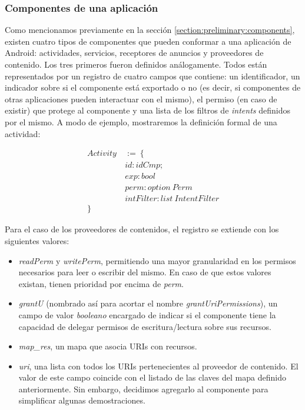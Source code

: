 \subsubsection*{Componentes de una aplicación}
Como mencionamos previamente en la sección \ref{section:preliminary:components}, existen cuatro
tipos de componentes que pueden conformar a una aplicación de Android: actividades, servicios,
receptores de anuncios y proveedores de contenido. Los tres primeros fueron definidos análogamente.
Todos están representados por un registro de cuatro campos que contiene: un identificador, un
indicador sobre si el componente está exportado o no (es decir, si componentes de otras aplicaciones
pueden interactuar con el mismo), el permiso (en caso de existir) que protege al componente y una
lista de los filtros de \textit{intents} definidos por el mismo. A modo de ejemplo, mostraremos la
definición formal de una actividad:

\begin{align*}
    Activity\  & :=\ \{                        \\
               & id: idCmp;                    \\
               & exp: bool                     \\
               & perm: option\ Perm            \\
               & intFilter: list\ IntentFilter \\
    \}
\end{align*}

Para el caso de los proveedores de contenidos, el registro se extiende con los siguientes valores:

\begin{itemize}
    \item \textit{readPerm} y \textit{writePerm}, permitiendo una mayor granularidad en los permisos
          necesarios para leer o escribir del mismo. En caso de que estos valores existan, tienen
          prioridad por encima de \textit{perm}.
    \item \textit{grantU} (nombrado así para acortar el nombre \textit{grantUriPermissions}), un
          campo de valor \textit{booleano} encargado de indicar si el componente tiene la capacidad
          de delegar permisos de escritura/lectura sobre sus recursos.
    \item \textit{map\_res}, un mapa que asocia URIs con recursos.
    \item \textit{uri}, una lista con todos los URIs pertenecientes al proveedor de contenido. El
          valor de este campo coincide con el listado de las claves del mapa definido anteriormente.
          Sin embargo, decidimos agregarlo al componente para simplificar algunas demostraciones.
\end{itemize}



